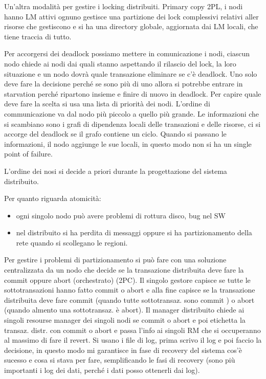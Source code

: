 Un'altra modalità per gestire i locking distribuiti. Primary copy 2PL, i nodi 
hanno LM attivi ognuno gestisce una partizione dei lock complessivi relativi aller 
risorse che gestiscono e si ha una directory globale, aggiornata dai LM locali,
che tiene traccia di tutto. 

Per accorgersi dei deadlock possiamo mettere in comunicazione i nodi, ciascun nodo
chiede ai nodi dai quali stanno aspettando il rilascio del lock, la loro situazione
e un nodo dovrà quale transazione eliminare se c'è deadlock. Uno solo deve fare 
la decisione perché se sono più di uno allora si potrebbe entrare in starvation
perché ripartono insieme e finire di nuovo in deadlock. Per capire quale deve
fare la scelta si usa una lista di priorità dei nodi. L'ordine di communicazione va 
dal nodo più piccolo a quello più grande. Le informazioni che si scambiano sono 
i grafi di dipendenza locali delle transazioni e delle risorse, ci si accorge del 
deadlock se il grafo contiene un ciclo. Quando si passano le informazioni, il nodo
aggiunge le sue locali, in questo modo non si ha un single point of failure. 

L'ordine dei nosi si decide a priori durante la progettazione del sistema distribuito.

Per quanto riguarda atomicità:
\begin{itemize}
      \item ogni singolo nodo può avere problemi di rottura disco, bug nel SW 
      \item nel distribuito si ha perdita di messaggi oppure si ha partizionamento
      della rete quando si scollegano le regioni.
\end{itemize}

Per gestire i problemi di partizionamento si può fare con una soluzione centralizzata 
da un nodo che decide se la transazione distribuita deve fare la commit oppure abort (orchestrato) (2PC).
Il singolo gestore capisce se tutte le sottotransazioni hanno fatto commit o abort 
e alla fine capisce se la transazione distribuita deve fare commit (quando tutte sottotransaz. sono commit ) o 
abort (quando almento una sottotransaz. è abort). Il manager distribuito chiede 
ai singoli resourse manager dei singoli nodi se commit o abort e poi etichetta la transaz. distr.
con commit o abort e passa l'info ai singoli RM che si occuperanno al massimo di 
fare il revert. Si usano i file di log, prima scrivo il log e poi faccio la decisione,
in questo modo mi garantisce in fase di recovery del sistema cos'è sucesso e cosa 
si stava per fare, semplificando le fasi di recovery (sono più importanti i log dei 
dati, perché i dati posso ottenerli dai log).


